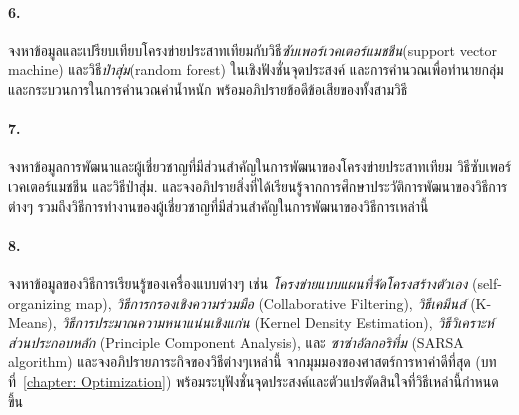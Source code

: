 \paragraph{6.}
จงหาข้อมูลและเปรียบเทียบโครงข่ายประสาทเทียมกับวิธี\textit{ซับเพอร์เวคเตอร์แมชชีน}(support vector machine)\cite{CortesVapnik1995a}
และวิธี\textit{ป่าสุ่ม}(random forest)\cite{Breiman2001a} ในเชิงฟังชั่นจุดประสงค์
และการคำนวณเพื่อทำนายกลุ่ม และกระบวนการในการคำนวณค่าน้ำหนัก
พร้อมอภิปรายข้อดีข้อเสียของทั้งสามวิธี

\paragraph{7.}
จงหาข้อมูลการพัฒนาและผู้เชี่ยวชาญที่มีส่วนสำคัญในการพัฒนาของโครงข่ายประสาทเทียม 
วิธีซับเพอร์เวคเตอร์แมชชีน
และวิธีป่าสุ่ม.
และจงอภิปรายสิ่งที่ได้เรียนรู้จากการศึกษาประวัติการพัฒนาของวิธีการต่างๆ รวมถึงวิธีการทำงานของผู้เชี่ยวชาญที่มีส่วนสำคัญในการพัฒนาของวิธีการเหล่านี้

\paragraph{8.}
จงหาข้อมูลของวิธีการเรียนรู้ของเครื่องแบบต่างๆ เช่น \textit{โครงข่ายแบบแผนที่จัดโครงสร้างตัวเอง} (self-organizing map)\cite{Kohonen1982a}, \textit{วิธีการกรองเชิงความร่วมมือ} (Collaborative Filtering)\cite{EkstrandEtAl2010a}, \textit{วิธีเคมีนส์} (K-Means)\cite{Bishop2006a}, \textit{วิธีการประมาณความหนาแน่นเชิงแก่น} (Kernel Density Estimation)\cite{Bishop2006a}, 
\textit{วิธีวิเคราะห์ส่วนประกอบหลัก} (Principle Component Analysis)\cite{Bishop2006a},
และ \textit{ซาซ่าอัลกอริทึ่ม} (SARSA algorithm)\cite{SuttonBarto1998a}
และจงอภิปรายภาระกิจของวิธีต่างๆเหล่านี้ จากมุมมองของศาสตร์การหาค่าดีที่สุด (บทที่~\ref{chapter: Optimization})
พร้อมระบุฟังชั่นจุดประสงค์และตัวแปรตัดสินใจที่วิธีเหล่านี้กำหนดขึ้น

